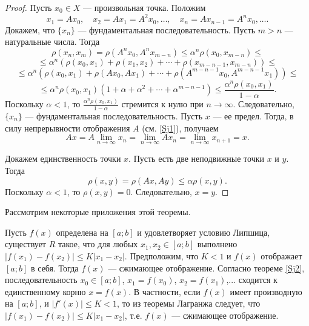 \documentclass[12pt, titlepage, oneside]{amsbook}
\theoremstyle{definition}
\theoremstyle{remark}
\begin{document}
\begin{proof}
Пусть $x_0\in X$ --- произвольная точка. Положим $$x_1=Ax_0,\quad x_2=Ax_1=A^2x_0,\ldots,\quad x_n=Ax_{n-1}=A^n x_0,\ldots.$$ Докажем, что $\{x_n\}$ --- фундаментальная последовательность. Пусть $m>n$ --- натуральные числа. Тогда $$\rho(x_n,x_m)=\rho(A^n x_0,A^n x_{m-n})\leq \alpha^n\rho(x_0,x_{m-n})\leq$$ $$\leq\alpha^n(\rho(x_0,x_1)+\rho(x_1,x_2)+\cdots+\rho(x_{m-n-1},x_{m-n}))\leq$$ $$\leq\alpha^n(\rho(x_0,x_1)+\rho(Ax_0,Ax_1)+\cdots+\rho(A^{m-n-1}x_0,A^{m-n-1}x_1))\leq$$ $$\leq\alpha^n\rho(x_0,x_1)(1+\alpha+\alpha^2+\cdots+\alpha^{m-n-1})\leq\frac{\alpha^n\rho(x_0,x_1)}{1-\alpha}.$$ Поскольку $\alpha<1$, то $\frac{\alpha^n\rho(x_0,x_1)}{1-\alpha}$ стремится к нулю при $n\rightarrow\infty$. Следовательно, $\{x_n\}$ --- фундаментальная последовательность. Пусть $x$ --- ее предел. Тогда, в силу непрерывности отображения $A$ (см. \ref{Sj1}), получаем $$Ax=A\lim\limits_{n\rightarrow\infty} x_n=\lim\limits_{n\rightarrow\infty}A x_n=\lim\limits_{n\rightarrow\infty}x_{n+1}=x.$$

Докажем единственность точки $x$. Пусть есть две неподвижные точки $x$ и $y$. Тогда $$\rho(x,y)=\rho(Ax,Ay)\leq\alpha\rho(x,y).$$ Поскольку $\alpha<1$, то $\rho(x,y)=0$. Следовательно, $x=y$.
\end{proof}

Рассмотрим некоторые приложения этой теоремы.

Пусть $f(x)$ определена на $[a;b]$ и удовлетворяет условию Липшица, существует $R$ такое, что для любых $x_1,x_2\in[a;b]$ выполнено $|f(x_1)-f(x_2)|\leq K|x_1-x_2|$. Предположим, что $K<1$ и $f(x)$ отображает $[a;b]$ в себя. Тогда $f(x)$ --- сжимающее отображение. Согласно теореме \ref{Sj2}, последовательность $x_0\in [a;b]$, $x_1=f(x_0)$, $x_2=f(x_1)$,... сходится к единственному корню $x=f(x)$. В частности, если $f(x)$ имеет производную на $[a;b]$, и $|f'(x)|\leq K<1$, то из теоремы Лагранжа следует, что $|f(x_1)-f(x_2)|\leq K|x_1-x_2|$, т.е. $f(x)$ --- сжимающее отображение.
\end{document}
